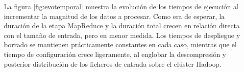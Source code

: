 La figura \ref{fig:evotemporal} muestra la evoluci\'on de los tiempos de ejecuci\'on al incrementar la magnitud de los datos a procesar. Como era de esperar, la duraci\'on de la etapa MapReduce y la duraci\'on total crecen en relaci\'on directa con el tama\~no de entrada, pero en menor medida. Los tiempos de despliegue y bo\-rra\-do se mantienen pr\'acticamente constantes en cada caso, mientras que el tiempo de configuraci\'on crece ligeramente, al englobar la descompresi\'on y posterior distribuci\'on de los ficheros de entrada sobre el cl\'uster Hadoop.
